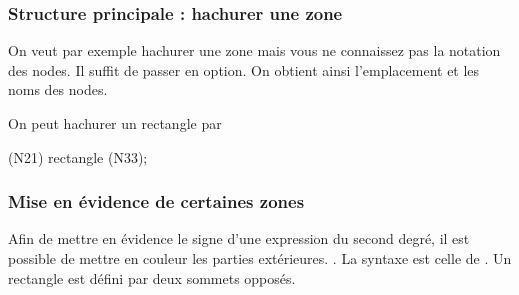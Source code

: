 \subsubsection{Structure principale : hachurer une zone}
  
On veut par exemple hachurer une zone mais vous ne connaissez pas la notation des nodes. Il suffit de passer  en option. On obtient ainsi l'emplacement et les noms des nodes.
  
\begin{tkzexample}
\end{tkzexample}


\medskip
On peut  hachurer un rectangle par 

    \begin{tkzexample}
    \pattern[pattern=north west lines] (N21) rectangle (N33);
    \end{tkzexample}
    
    
\begin{tkzexample}[small]
\end{tkzexample}

  

\subsubsection{Mise en évidence de certaines zones}

Afin de mettre en évidence le signe d'une expression du second degré, il est possible de mettre en couleur les parties extérieures. . La syntaxe est celle de \TIKZ. Un rectangle est défini par deux sommets opposés. 

\begin{tkzexample}
\end{tkzexample}  

